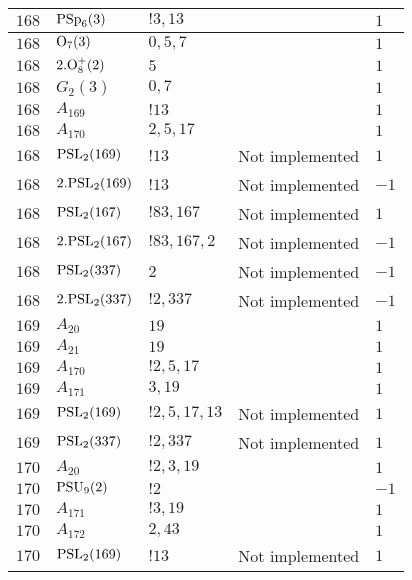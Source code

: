 \documentclass[a4paper, 11pt]{article}
\begin{document}
\begin{longtable}{lllll}
        $ 168 $ & $ {\rm PSp}_{6}(3) $ & $ ! 3,13 $ & $ ~ $ & $ 1$ \\ \hline
        $ 168 $ & $ {\rm O}_{7}(3) $ & $ 0, 5, 7 $ & $ ~ $ & $ 1$ \\ \hline
        $ 168 $ & $ 2.{\rm O}_{8}^+(2) $ & $ 5 $ & $ ~ $ & $ 1$ \\ \hline
        $ 168 $ & $ G_{2}(3) $ & $ 0,7 $ & $ ~ $ & $ 1$ \\ \hline
        $ 168 $ & $ A_{169} $ & $ !13 $ & $ ~ $ & $ 1$ \\ \hline
        $ 168 $ & $ A_{170} $ & $ 2, 5, 17 $ & $ ~ $ & $ 1$ \\ \hline
        $ 168 $ & $ {\rm PSL}_{2}(169) $ & $ !13 $ &  Not implemented & $ 1$ \\ \hline
        $ 168 $ & $ 2.{\rm PSL}_{2}(169) $ & $ !13 $ &  Not implemented & $ -1$ \\ \hline
        $ 168 $ & $ {\rm PSL}_{2}(167) $ & $ !83, 167 $ &  Not implemented & $ 1$ \\ \hline
        $ 168 $ & $ 2.{\rm PSL}_{2}(167) $ & $ !83, 167, 2 $ &  Not implemented & $ -1$ \\ \hline
        $ 168 $ & $ {\rm PSL}_{2}(337) $ & $ 2 $ &  Not implemented & $ -1$ \\ \hline
        $ 168 $ & $ 2.{\rm PSL}_{2}(337) $ & $ !2, 337 $ &  Not implemented & $ -1$ \\ \hline
        $ 169 $ & $ A_{20} $ & $ 19 $ & $ ~ $ & $ 1$ \\ \hline
        $ 169 $ & $ A_{21} $ & $ 19 $ & $ ~ $ & $ 1$ \\ \hline
        $ 169 $ & $ A_{170} $ & $ !2, 5, 17 $ & $ ~ $ & $ 1$ \\ \hline
        $ 169 $ & $ A_{171} $ & $ 3, 19 $ & $ ~ $ & $ 1$ \\ \hline
        $ 169 $ & $ {\rm PSL}_{2}(169) $ & $ !2, 5, 17, 13 $ &  Not implemented & $ 1$ \\ \hline
        $ 169 $ & $ {\rm PSL}_{2}(337) $ & $ !2, 337 $ &  Not implemented & $ 1$ \\ \hline
        $ 170 $ & $ A_{20} $ & $ ! 2,3,19 $ & $ ~ $ & $ 1$ \\ \hline
        $ 170 $ & $ {\rm PSU}_{9}(2) $ & $ ! 2 $ & $ ~ $ & $ -1$ \\ \hline
        $ 170 $ & $ A_{171} $ & $ !3, 19 $ & $ ~ $ & $ 1$ \\ \hline
        $ 170 $ & $ A_{172} $ & $ 2, 43 $ & $ ~ $ & $ 1$ \\ \hline
        $ 170 $ & $ {\rm PSL}_{2}(169) $ & $ !13 $ &  Not implemented & $ 1$ \\ \hline

\end{longtable}
\end{document}
